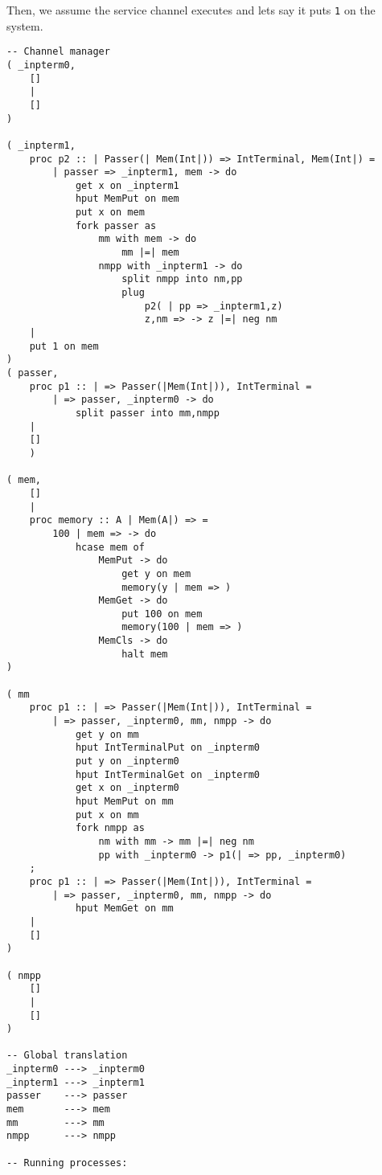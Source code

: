 \documentclass{article}
\theoremstyle{plain}%
\theoremstyle{definition}
\theoremstyle{remark}
\begin{document}
Then, we assume the service channel executes and lets say it puts \verb|1| on the system.
\begin{verbatim}
-- Channel manager
( _inpterm0,  
    []
    |
    []
)

( _inpterm1,  
    proc p2 :: | Passer(| Mem(Int|)) => IntTerminal, Mem(Int|) =
        | passer => _inpterm1, mem -> do
            get x on _inpterm1
            hput MemPut on mem
            put x on mem
            fork passer as
                mm with mem -> do
                    mm |=| mem
                nmpp with _inpterm1 -> do
                    split nmpp into nm,pp
                    plug
                        p2( | pp => _inpterm1,z)
                        z,nm => -> z |=| neg nm
    |
    put 1 on mem
)
( passer,
    proc p1 :: | => Passer(|Mem(Int|)), IntTerminal = 
        | => passer, _inpterm0 -> do
            split passer into mm,nmpp 
    |
    []
    )

( mem,
    []
    |
    proc memory :: A | Mem(A|) => =
        100 | mem => -> do
            hcase mem of
                MemPut -> do
                    get y on mem
                    memory(y | mem => )
                MemGet -> do
                    put 100 on mem
                    memory(100 | mem => )
                MemCls -> do
                    halt mem
)

( mm
    proc p1 :: | => Passer(|Mem(Int|)), IntTerminal = 
        | => passer, _inpterm0, mm, nmpp -> do
            get y on mm
            hput IntTerminalPut on _inpterm0
            put y on _inpterm0
            hput IntTerminalGet on _inpterm0
            get x on _inpterm0
            hput MemPut on mm
            put x on mm
            fork nmpp as
                nm with mm -> mm |=| neg nm 
                pp with _inpterm0 -> p1(| => pp, _inpterm0)
    ;
    proc p1 :: | => Passer(|Mem(Int|)), IntTerminal = 
        | => passer, _inpterm0, mm, nmpp -> do
            hput MemGet on mm 
    |
    []
)

( nmpp
    []
    |
    []
)

-- Global translation
_inpterm0 ---> _inpterm0 
_inpterm1 ---> _inpterm1 
passer    ---> passer 
mem       ---> mem
mm        ---> mm
nmpp      ---> nmpp

-- Running processes:
\end{verbatim}
\end{document}
